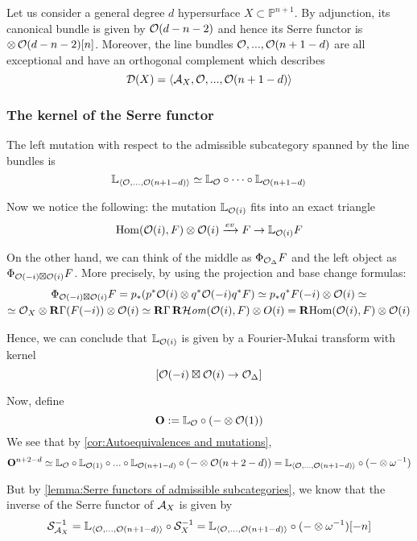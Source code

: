 Let us consider a general degree $d$ hypersurface $X \subset \mathbb{P}^{n+1}$. By adjunction, its canonical bundle is given by $\mathcal{O}(d-n-2)$ and hence its Serre functor is $\otimes \,\mathcal{O}(d-n-2)[n] $. Moreover, the line bundles $\mathcal{O},...,\mathcal{O}(n+1-d)$ are all exceptional and have an orthogonal complement which describes $$\mathcal{D}(X)=\langle \mathcal{A}_X,\mathcal{O},...,\mathcal{O}(n+1-d) \rangle $$

\subsubsection{The kernel of the Serre functor}

The left mutation with respect to the admissible subcategory spanned by the line bundles is $$\mathbb{L}_{\langle \mathcal{O}, \dots, \mathcal{O}(n+1-d) \rangle}\simeq \mathbb{L}_{\mathcal{O}} \circ \dots \circ \mathbb{L}_{\mathcal{O}(n+1-d)}$$

Now we notice the following: the mutation $\mathbb{L}_{\mathcal{O}(i)}$ fits into an exact triangle $$\operatorname{Hom}(\mathcal{O}(i), F)\otimes \mathcal{O}(i) \xrightarrow{ev} F \rightarrow \mathbb{L}_{\mathcal{O}(i)} F$$

On the other hand, we can think of the middle as $\Phi_{\mathcal{O}_\Delta}F$ and the left object as $\Phi_{\mathcal{O}(-i)\boxtimes \mathcal{O}(i)}F$. More precisely, by using the projection and base change formulas:
\begin{gather*}
    \Phi_{\mathcal{O}(-i)\boxtimes \mathcal{O}(i)}F=p_* (p^*\mathcal{O}(i)\otimes q^* \mathcal{O}(-i)q^*F)\simeq p_* q^* F(-i)\otimes \mathcal{O}(i)\simeq\\
    \simeq \mathcal{O}_X \otimes \operatorname{\mathbf{R}\Gamma} (F(-i))\otimes \mathcal{O}(i)\simeq \operatorname{\mathbf{R}\Gamma} \operatorname{\mathbf{R}\mathcal{H}\mathit{om}}(\mathcal{O}(i),F) \otimes O(i)=\operatorname{\mathbf{R} Hom}(\mathcal{O}(i),F) \otimes \mathcal{O}(i)
\end{gather*}

Hence, we can conclude that $\mathbb{L}_{\mathcal{O}(i)}$ is given by a Fourier-Mukai transform with kernel $$[\mathcal{O}(-i)\boxtimes \mathcal{O}(i)\rightarrow \mathcal{O}_\Delta]$$

Now, define $$\mathbf{O}:=\mathbb{L}_{\mathcal{O}} \circ (-\otimes \mathcal{O}(1))$$
We see that by \ref{cor:Autoequivalences and mutations}, $$\mathbf{O}^{n+2-d}\simeq \mathbb{L}_{\mathcal{O}} \circ \mathbb{L}_{\mathcal{O}(1)}\circ ... \circ \mathbb{L}_{\mathcal{O}(n+1-d)}\circ (-\otimes \mathcal{O}(n+2-d))=\mathbb{L}_{\langle \mathcal{O}, \dots, \mathcal{O}(n+1-d) \rangle} \circ (-\otimes \omega ^{-1})$$

But by \ref{lemma:Serre functors of admissible subcategories}, we know that the inverse of the Serre functor of $\mathcal{A}_X$ is given by $$\mathcal{S}_{\mathcal{A}_X}^{-1} =  \mathbb{L}_{\langle \mathcal{O}, \dots, \mathcal{O}(n+1-d) \rangle} \circ \mathcal{S}_X ^{-1}=\mathbb{L}_{\langle \mathcal{O}, \dots, \mathcal{O}(n+1-d) \rangle} \circ (-\otimes \omega^{-1})[-n]$$

